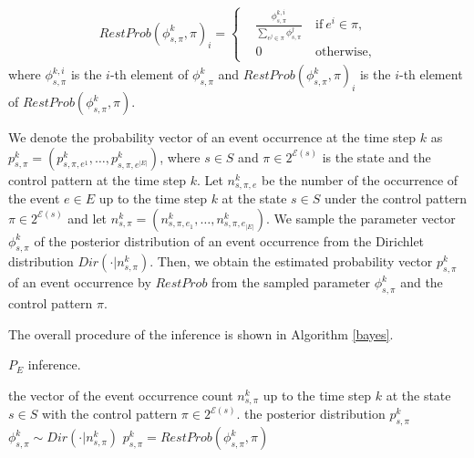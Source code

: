 \begin{align}
  RestProb(\phi^k_{s,\pi},\pi)_i =
  \left\{
  \begin{aligned}
    & \frac{\phi^{k,i}_{s,\pi}}{\sum_{e^j \in \pi} \phi^j_{s,\pi}} \  &\text{if}\ e^i \in \pi,\\
    &0   \ &\text{otherwise},
  \end{aligned}
  \right.
\end{align}
where $\phi^{k,i}_{s,\pi}$ is the $i$-th element of $\phi^k_{s,\pi}$ and $RestProb(\phi^k_{s,\pi},\pi)_i$ is the $i$-th element of $RestProb(\phi^k_{s,\pi},\pi)$.

We denote the probability vector of an event occurrence at the time step $k$ as $p^k_{s,\pi} = (p^k_{s,\pi,e^1}, \ldots, p^k_{s,\pi,e^{|E|}})$, where $s \in S$ and $\pi \in 2^{\mathcal{E}(s)}$ is the state and the control pattern at the time step $k$. Let $n^k_{s,\pi,e}$ be the number of the occurrence of the event $e \in E$ up to the time step $k$ at the state $s \in S$ under the control pattern $\pi \in 2^{\mathcal{E}(s)}$ and let $n^k_{s,\pi} = (n^k_{s,\pi,e_1}, \ldots, n^k_{s,\pi,e_{|E|}})$.
We sample the parameter vector $\phi^k_{s,\pi}$ of the posterior distribution of an event occurrence from the Dirichlet distribution $Dir(\cdot|n^k_{s,\pi})$. Then, we obtain the estimated probability vector $p^k_{s,\pi}$ of an event occurrence by $RestProb$ from the sampled parameter $\phi^k_{s,\pi}$ and the control pattern $\pi$.

The overall procedure of the inference is shown in Algorithm \ref{bayes}.

\begin{algorithm}[H]
 \caption{$P_E$ inference.}
 \begin{algorithmic}[1]
 \renewcommand{\algorithmicrequire}{\textbf{Input:}}
 \renewcommand{\algorithmicensure}{\textbf{Output:}}
 \REQUIRE the vector of the event occurrence count $n^k_{s,\pi}$ up to the time step $k$ at the state $s \in S$ with the control pattern $\pi \in 2^{\mathcal{E}(s)}$.
 \ENSURE  the posterior distribution $p^k_{s,\pi}$
  \STATE $\phi^k_{s,\pi} \sim Dir(\cdot|n^k_{s,\pi})$
  \STATE $p^k_{s,\pi} = RestProb(\phi^k_{s,\pi},\pi)$
 \end{algorithmic}
 \label{bayes}
 \end{algorithm}

